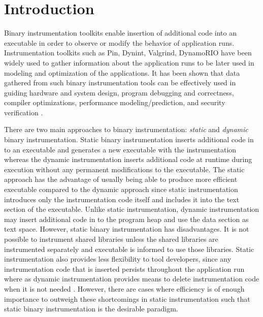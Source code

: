 \section{Introduction}

Binary instrumentation toolkits enable insertion of additional code into an
executable in order to observe or modify the behavior of application runs. 
Instrumentation toolkits such as Pin\cite{luk2005pin}, Dynint\cite{buck2000api}, 
Valgrind\cite{nethercote2007valgrind}, DynamoRIO\cite{bruening2004efficient} have been widely used to gather information about the
application runs to be later used in modeling and optimization
of the applications. It has been shown that data gathered 
from such binary instrumentation tools can be effectively used in guiding hardware and
system design, program debugging and correctness, compiler optimizations,
performance modeling/prediction, and security verification \cite{snavely2001modeling}.

There are two main approaches to binary instrumentation: \textit{static} 
and \textit{dynamic} binary instrumentation. Static binary
instrumentation inserts additional code in to an executable and generates a new
executable with the instrumentation whereas the dynamic instrumentation inserts additional code 
at runtime during  execution without any permanent modifications to the executable.
 The static approach has the advantage of usually being able to produce
more efficient  executable compared to the dynamic approach
since static instrumentation introduces only the instrumentation code itself 
 and includes it into the text section of the executable. Unlike static instrumentation, dynamic
instrumentation may insert additional code in to the program heap and use the data section as text space.
However, static binary instrumentation has disadvantages. It is not possible to instrument shared libraries 
unless the shared libraries are instrumented separately and executable is informed to use those libraries. 
Static instrumentation also provides less flexibility to tool developers, since any instrumentation code that is
inserted persists throughout the application run where as dynamic instrumentation 
provides means to delete instrumentation code when it is not needed \cite{tikir2002efficient}.
However, there are cases where efficiency is of enough importance to outweigh
these shortcomings in static instrumentation \cite{carrington2006performance} such that static binary instrumentation is the
desirable paradigm.

